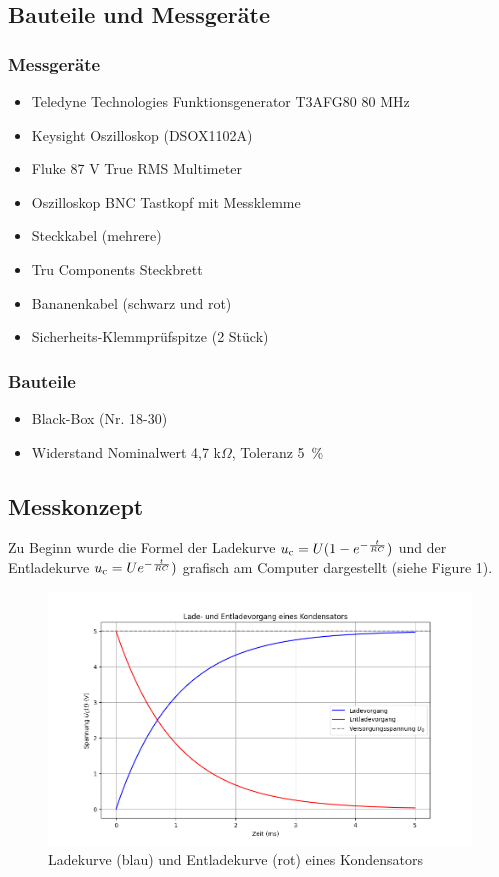 \documentclass[a4paper,12pt]{article}
\begin{document}
\subsection{Bauteile und Messgeräte}
\subsubsection*{Messgeräte}
\begin{itemize}
\item Teledyne Technologies Funktionsgenerator T3AFG80 80 MHz
\item Keysight Oszilloskop (DSOX1102A)
\item Fluke 87 V True RMS Multimeter
\item Oszilloskop BNC Tastkopf mit Messklemme
\item Steckkabel (mehrere)
\item Tru Components Steckbrett
\item Bananenkabel (schwarz und rot)
\item Sicherheits-Klemmprüfspitze (2 Stück)
\end{itemize}

\subsubsection*{Bauteile}
\begin{itemize}
\item Black-Box (Nr. 18-30)
\item Widerstand Nominalwert 4,7 k$\Omega$, Toleranz 5~\%
\end{itemize}




\subsection{Messkonzept}
Zu Beginn wurde die Formel der Ladekurve \( u\textsubscript{c} = U (1 -e ^{-\frac{t}{RC}}) \) und der Entladekurve  \( u\textsubscript{c} = Ue ^{-\frac{t}{RC}}) \) grafisch am Computer dargestellt (siehe Figure 1). 

\begin{figure}[H]
    \centering
    \includegraphics[width=1.0\textwidth]{../Quellen/Labor2/Lade-EntladefunktionSkizze.png}
\caption{Ladekurve (blau) und Entladekurve (rot) eines Kondensators}
\end{figure}
\end{document}
